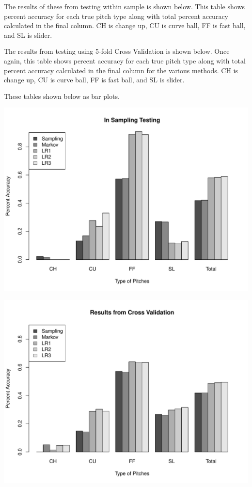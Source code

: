 \documentclass{article}
\begin{document}
\noindent The results of these from testing within sample is shown below. This table shows percent accuracy for each true pitch type along with total percent accuracy calculated in the final column. CH is change up, CU is curve ball, FF is fast ball, and SL is slider.



\noindent The results from testing using 5-fold Cross Validation is shown below. Once again, this table shows percent accuracy for each true pitch type along with total percent accuracy calculated in the final column for the various methods. CH is change up, CU is curve ball, FF is fast ball, and SL is slider.



\noindent These tables shown below as bar plots.

\begin{center}
		\includegraphics[scale = .7]{NOT_CV.pdf}
\end{center}

\begin{center}
		\includegraphics[scale = .7]{CV.pdf}
\end{center}
\end{document}
